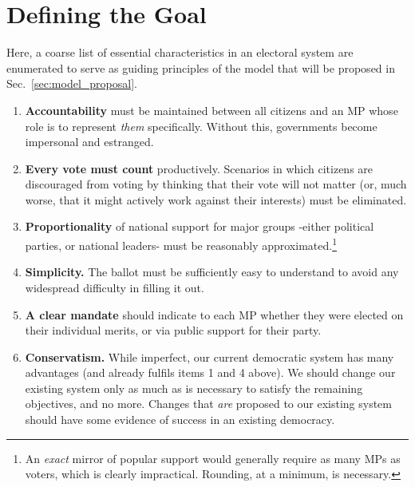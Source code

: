 \documentclass[DIV=calc, paper=a4, fontsize=11pt, twocolumn]{scrartcl}	 %
\begin{document}
\section{Defining the Goal}
\label{sec:goal_list}

Here, a coarse list of essential characteristics in an electoral system are enumerated to serve as guiding principles of the model that will be proposed in Sec.~\ref{sec:model_proposal}.  
\begin{enumerate}
\item \textbf{Accountability} must be maintained between all citizens and an MP whose role is to represent \emph{them} specifically. Without this, governments become impersonal and estranged.
\item \textbf{Every vote must count} productively. Scenarios in which citizens are discouraged from voting by thinking that their vote will not matter (or, much worse, that it might actively work against their interests) must be eliminated.
\item \textbf{Proportionality} of national support for major groups \--either political parties, or national leaders\-- must be reasonably approximated.\footnote{
An \emph{exact} mirror of popular support would generally require as many MPs as voters, which is clearly impractical. Rounding, at a minimum, is necessary.
}
\item   \textbf{Simplicity.} The ballot must be sufficiently easy to understand to avoid any widespread difficulty in filling it out. 

\item  \textbf{A clear mandate} should indicate to each MP whether they were elected on their individual merits, or via public support for their party.
\item \textbf{Conservatism.} While imperfect, our current democratic system has many advantages (and already fulfils items 1 and 4 above). We should change our existing system only as much as is necessary to satisfy the remaining objectives, and no more. Changes that \emph{are} proposed to our existing system should have some evidence of success in an existing democracy.
\end{enumerate}

\end{document}
